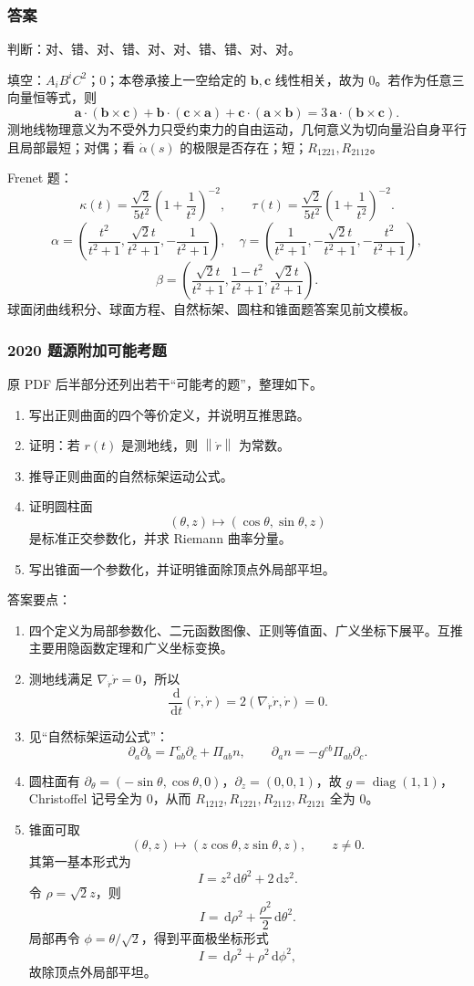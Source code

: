 \documentclass[UTF8,12pt,a4paper]{ctexart}
\newcommand{\dd}{\,\mathrm d}
\newcommand{\vct}[1]{\boldsymbol{#1}}
\newcommand{\norm}[1]{\left\lVert #1\right\rVert}
\newcommand{\inner}[2]{\left(#1,#2\right)}
\begin{document}
\subsubsection*{答案}
判断：对、错、对、错、对、对、错、错、对、对。

填空：$A_iB^iC^2$；$0$；本卷承接上一空给定的 $\vct b,\vct c$ 线性相关，故为 $0$。若作为任意三向量恒等式，则
\[
\vct a\cdot(\vct b\times\vct c)+\vct b\cdot(\vct c\times\vct a)+\vct c\cdot(\vct a\times\vct b)
=3\,\vct a\cdot(\vct b\times\vct c).
\]
测地线物理意义为不受外力只受约束力的自由运动，几何意义为切向量沿自身平行且局部最短；对偶；看 $\dot\alpha(s)$ 的极限是否存在；短；$R_{1221},R_{2112}$。

Frenet 题：
\[
\kappa(t)=\frac{\sqrt2}{5t^2}\left(1+\frac1{t^2}\right)^{-2},\qquad
\tau(t)=\frac{\sqrt2}{5t^2}\left(1+\frac1{t^2}\right)^{-2}.
\]
\[
\alpha=\left(\frac{t^2}{t^2+1},\frac{\sqrt2t}{t^2+1},-\frac1{t^2+1}\right),
\quad
\gamma=\left(\frac1{t^2+1},-\frac{\sqrt2t}{t^2+1},-\frac{t^2}{t^2+1}\right),
\]
\[
\beta=\left(\frac{\sqrt2t}{t^2+1},\frac{1-t^2}{t^2+1},\frac{\sqrt2t}{t^2+1}\right).
\]
球面闭曲线积分、球面方程、自然标架、圆柱和锥面题答案见前文模板。

\subsubsection*{2020 题源附加可能考题}
原 PDF 后半部分还列出若干“可能考的题”，整理如下。
\begin{enumerate}
\item 写出正则曲面的四个等价定义，并说明互推思路。
\item 证明：若 $r(t)$ 是测地线，则 $\norm{\dot r}$ 为常数。
\item 推导正则曲面的自然标架运动公式。
\item 证明圆柱面
\[
(\theta,z)\mapsto(\cos\theta,\sin\theta,z)
\]
是标准正交参数化，并求 Riemann 曲率分量。
\item 写出锥面一个参数化，并证明锥面除顶点外局部平坦。
\end{enumerate}

答案要点：
\begin{enumerate}
\item 四个定义为局部参数化、二元函数图像、正则等值面、广义坐标下展平。互推主要用隐函数定理和广义坐标变换。
\item 测地线满足 $\nabla_{\dot r}\dot r=0$，所以
\[
\frac{\dd}{\dd t}\inner{\dot r}{\dot r}
=2\inner{\nabla_{\dot r}\dot r}{\dot r}=0.
\]
\item 见“自然标架运动公式”：
\[
\partial_a\partial_b=\Gamma^c_{ab}\partial_c+\Pi_{ab}n,\qquad
\partial_an=-g^{cb}\Pi_{ab}\partial_c.
\]
\item 圆柱面有 $\partial_\theta=(-\sin\theta,\cos\theta,0)$，$\partial_z=(0,0,1)$，故 $g=\operatorname{diag}(1,1)$，Christoffel 记号全为 $0$，从而 $R_{1212},R_{1221},R_{2112},R_{2121}$ 全为 $0$。
\item 锥面可取
\[
(\theta,z)\mapsto(z\cos\theta,z\sin\theta,z),\qquad z\ne0.
\]
其第一基本形式为
\[
I=z^2\dd\theta^2+2\dd z^2.
\]
令 $\rho=\sqrt2 z$，则
\[
I=\dd\rho^2+\frac{\rho^2}{2}\dd\theta^2.
\]
局部再令 $\phi=\theta/\sqrt2$，得到平面极坐标形式
\[
I=\dd\rho^2+\rho^2\dd\phi^2,
\]
故除顶点外局部平坦。
\end{enumerate}
\end{document}
